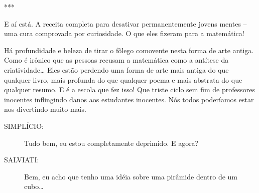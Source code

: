 \documentclass[a4paper,oneside,12pt,notitlepage]{article}
\begin{document}
\vspace{1em}

\begin{center}
***
\end{center}

\vspace{1em}

E aí está.
A receita completa para desativar permanentemente jovens mentes -- uma cura comprovada por curiosidade.
O que eles fizeram para a matemática!

Há profundidade e beleza de tirar o fôlego comovente nesta forma de arte antiga.
Como é irônico que as pessoas recusam a matemática como a antítese da criatividade\ldots
Eles estão perdendo uma forma de arte mais antiga do que qualquer livro, mais profunda do que qualquer poema e mais abstrata do que qualquer resumo.
E é a escola que fez isso!
Que triste ciclo sem fim de professores inocentes inflingindo danos aos estudantes inocentes.
Nós todos poderíamos estar nos divertindo muito mais.

\begin{description}
\item[SIMPLÍCIO:] Tudo bem, eu estou completamente deprimido. E agora?
\item[SALVIATI:] Bem, eu acho que tenho uma idéia sobre uma pirâmide dentro de um cubo\ldots
\end{description}
\end{document}
